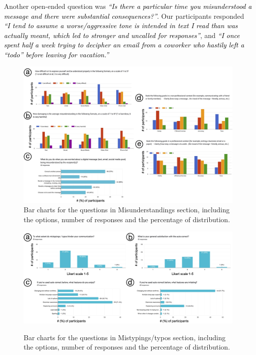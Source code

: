 \documentclass[acmsmall,screen,authorversion,nonacm]{acmart}
\newcommand{\QUOTE}[1]{\textsf{\textit{\textcolor{black}{``#1''}}}}
\begin{document}
Another open-ended question was \QUOTE{Is there a particular time you misunderstood a message and there were substantial consequences?}. Our participants responded \QUOTE{I tend to assume a worse/aggressive tone is intended in text I read than was actually meant, which led to stronger and uncalled for responses}, and \QUOTE{I once spent half a week trying to decipher an email from a coworker who hastily left a “todo” before leaving for vacation.}


\begin{figure}[h]
\begin{center}
\includegraphics[width=1.0\linewidth]{figures/misunderstanding.jpg}
\vspace{-1.5pc}
\caption{Bar charts for the questions in Misunderstandings section, including the options, number of responses and the percentage of distribution.}
\label{fig:misunderstanding}
\vspace{-1pc}
\Description{}
\end{center}
\end{figure}



\begin{figure}[h]
\begin{center}
\includegraphics[width=1.0\linewidth]{figures/mistyping.jpg}
\vspace{-1.5pc}
\caption{Bar charts for the questions in Mistypings/typos section, including the options, number of responses and the percentage of distribution.}
\vspace{-1.pc}
\label{fig:mistyping}
\Description{}
\end{center}
\end{figure}
\end{document}
